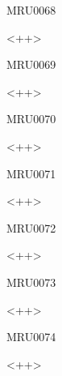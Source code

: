 \documentclass{article}
\begin{document}
\begin{corrige}{MRU0068}

<++>

\end{corrige}%


\begin{corrige}{MRU0069}

<++>

\end{corrige}%


\begin{corrige}{MRU0070}

<++>

\end{corrige}%


\begin{corrige}{MRU0071}

<++>

\end{corrige}%


\begin{corrige}{MRU0072}

<++>

\end{corrige}%


\begin{corrige}{MRU0073}

<++>

\end{corrige}%


\begin{corrige}{MRU0074}

<++>

\end{corrige}%
\end{document}
